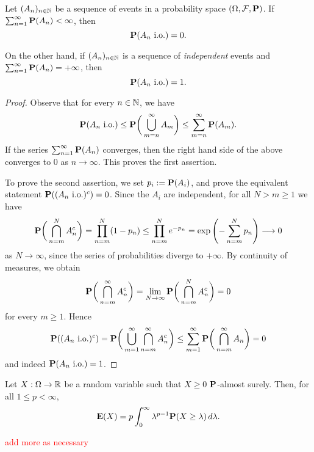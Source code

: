 \begin{lemma}
\label{lem:BC}
Let $(A_n)_{n\in\mathbb{N}}$ be a sequence of events in a probability space $(\Omega,\mathcal{F},\mathbf{P})$. If $\sum_{n=1}^\infty \mathbf{P}(A_n)<\infty$, then
\begin{equation*}
    \mathbf{P}(A_n \textnormal{ i.o.}) = 0.
\end{equation*}

On the other hand, if $(A_n)_{n\in\mathbb{N}}$ is a sequence of \emph{independent} events and $\sum_{n=1}^\infty \mathbf{P}(A_n) = +\infty$, then
\begin{equation*}
    \mathbf{P}(A_n \textnormal{ i.o.}) = 1.
\end{equation*}
\end{lemma}

\begin{proof}
    Observe that for every $n\in\mathbb{N}$, we have
    \begin{equation*}
        \mathbf{P}(A_n \text{ i.o.}) \le \mathbf{P}\bigg(\bigcup_{m=n}^\infty A_m\bigg) \le \sum_{m=n}^\infty \mathbf{P}(A_m).
    \end{equation*}
    If the series $\sum_{n=1}^\infty \mathbf{P}(A_n)$ converges, then the right hand side of the above converges to $0$ as $n\to\infty$. This proves the first assertion.

    To prove the second assertion, we set $p_i := \mathbf{P}(A_i)$, and prove the equivalent statement $\mathbf{P}((A_n \text{ i.o.})^c) = 0$. Since the $A_i$ are independent, for all $N>m\ge 1$ we have
    \begin{equation*}
    \mathbf{P}\bigg( \bigcap_{n=m}^N A_n^c \bigg) = \prod_{n=m}^N (1 - p_n) \le \prod_{n=m}^N e^{-p_n} = \exp\left( -\sum_{n=m}^N p_n \right) \longrightarrow 0
    \end{equation*}
    as $N\to\infty$, since the series of probabilities diverge to $+\infty$. By continuity of measures, we obtain
    \begin{equation*}
    \mathbf{P}\bigg(\bigcap_{n=m}^\infty A_n^c\bigg) = \lim_{N \to \infty} \mathbf{P}\bigg( \bigcap_{n=m}^N A_n^c \bigg) = 0
    \end{equation*}
    for every $m\ge 1$. Hence
    \begin{equation*}
    \mathbf{P}( (A_n \text{ i.o.})^c) = \mathbf{P}\bigg( \bigcup_{m=1}^\infty \bigcap_{n=m}^\infty A_n^c \bigg) \le \sum_{m=1}^\infty \mathbf{P}\bigg(\bigcap_{n=m}^\infty A_n\bigg) = 0
    \end{equation*}
    and indeed $\mathbf{P}(A_n \text{ i.o.}) = 1$.
\end{proof}

\begin{proposition}
    Let $X:\Omega\to\mathbb{R}$ be a random variable such that $X\ge 0$ $\mathbf{P}$-almost surely. Then, for all $1\le p<\infty$,
    \begin{equation}
        \mathbf{E}(X) = p\int_0^\infty \lambda^{p-1}\mathbf{P}(X\ge \lambda)\,d\lambda.
    \end{equation}
\end{proposition}

\textcolor{red}{add more as necessary}